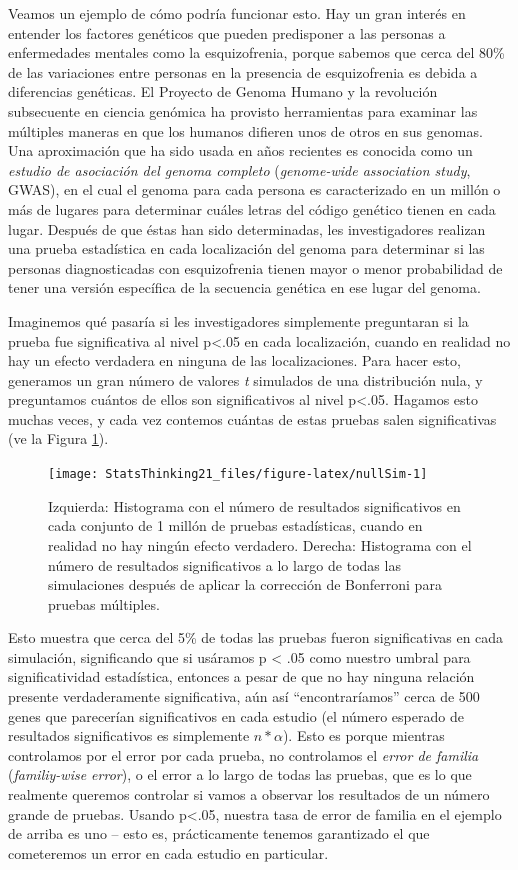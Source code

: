 \documentclass[
  12pt,
]{book}
\begin{document}
Veamos un ejemplo de cómo podría funcionar esto. Hay un gran interés en entender los factores genéticos que pueden predisponer a las personas a enfermedades mentales como la esquizofrenia, porque sabemos que cerca del 80\% de las variaciones entre personas en la presencia de esquizofrenia es debida a diferencias genéticas. El Proyecto de Genoma Humano y la revolución subsecuente en ciencia genómica ha provisto herramientas para examinar las múltiples maneras en que los humanos difieren unos de otros en sus genomas. Una aproximación que ha sido usada en años recientes es conocida como un \emph{estudio de asociación del genoma completo} (\emph{genome-wide association study}, GWAS), en el cual el genoma para cada persona es caracterizado en un millón o más de lugares para determinar cuáles letras del código genético tienen en cada lugar. Después de que éstas han sido determinadas, les investigadores realizan una prueba estadística en cada localización del genoma para determinar si las personas diagnosticadas con esquizofrenia tienen mayor o menor probabilidad de tener una versión específica de la secuencia genética en ese lugar del genoma.

Imaginemos qué pasaría si les investigadores simplemente preguntaran si la prueba fue significativa al nivel p\textless.05 en cada localización, cuando en realidad no hay un efecto verdadera en ninguna de las localizaciones. Para hacer esto, generamos un gran número de valores \emph{t} simulados de una distribución nula, y preguntamos cuántos de ellos son significativos al nivel p\textless.05. Hagamos esto muchas veces, y cada vez contemos cuántas de estas pruebas salen significativas (ve la Figura \ref{fig:nullSim}).

\begin{figure}
\texttt{[image: StatsThinking21\_files/figure-latex/nullSim-1]} \caption{Izquierda: Histograma con el número de resultados significativos en cada conjunto de 1 millón de pruebas estadísticas, cuando en realidad no hay ningún efecto verdadero. Derecha: Histograma con el número de resultados significativos a lo largo de todas las simulaciones después de aplicar la corrección de Bonferroni para pruebas múltiples.}\label{fig:nullSim}
\end{figure}

Esto muestra que cerca del 5\% de todas las pruebas fueron significativas en cada simulación, significando que si usáramos p \textless{} .05 como nuestro umbral para significatividad estadística, entonces a pesar de que no hay ninguna relación presente verdaderamente significativa, aún así ``encontraríamos'' cerca de 500 genes que parecerían significativos en cada estudio (el número esperado de resultados significativos es simplemente \(n * \alpha\)). Esto es porque mientras controlamos por el error por cada prueba, no controlamos el \emph{error de familia} (\emph{familiy-wise error}), o el error a lo largo de todas las pruebas, que es lo que realmente queremos controlar si vamos a observar los resultados de un número grande de pruebas. Usando p\textless.05, nuestra tasa de error de familia en el ejemplo de arriba es uno -- esto es, prácticamente tenemos garantizado el que cometeremos un error en cada estudio en particular.
\end{document}
